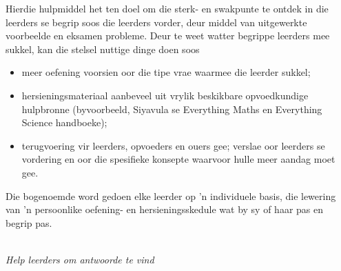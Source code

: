 {%
Hierdie hulpmiddel het ten doel om die sterk- en swakpunte te ontdek in die leerders se begrip soos die leerders vorder, deur middel van uitgewerkte voorbeelde en eksamen probleme. Deur te weet watter begrippe leerders mee sukkel, kan die stelsel nuttige dinge doen soos 
\begin{itemize}[noitemsep]
\item meer oefening voorsien oor die tipe vrae waarmee die leerder sukkel;
\item hersieningsmateriaal  aanbeveel uit vrylik beskikbare opvoedkundige hulpbronne (byvoorbeeld, Siyavula se Everything Maths en Everything Science handboeke);
\item terugvoering vir leerders, opvoeders en ouers gee; verslae oor leerders se vordering en oor die spesifieke konsepte waarvoor hulle meer aandag moet gee. 
\end{itemize}
Die bogenoemde word gedoen elke leerder op 'n individuele basis, die lewering van 'n persoonlike oefening- en hersieningsskedule wat by sy of haar pas en begrip pas. \par




\vspace*{1cm}
}
\\
{\normalfont\sffamily\fontsize{22}\normalfont\itshape Help leerders om antwoorde te vind} \par

